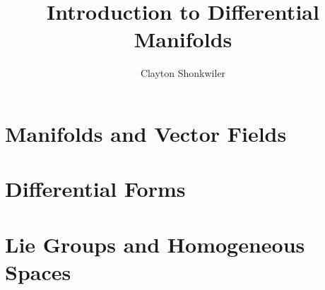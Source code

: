 \documentclass{report}
\title{Introduction to Differential Manifolds}
\author{Clayton Shonkwiler}
\date{}
\theoremstyle{definition}
\begin{document}
\maketitle

\tableofcontents

\chapter{Manifolds and Vector Fields}










\chapter{Differential Forms}










\chapter{Lie Groups and Homogeneous Spaces}










\end{document}
